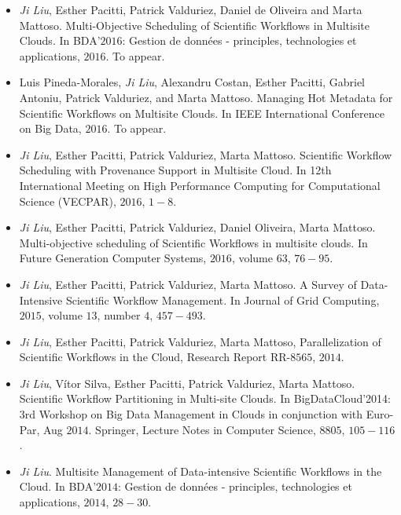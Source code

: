 \begin{itemize}

\item \textit{Ji Liu}, Esther Pacitti, Patrick Valduriez, Daniel de Oliveira and Marta Mattoso. Multi-Objective Scheduling of Scientific Workflows in Multisite Clouds. In BDA’$2016$: Gestion de données - principles, technologies et applications, $2016$. To appear.

\item Luis Pineda-Morales, \textit{Ji Liu}, Alexandru Costan, Esther Pacitti, Gabriel Antoniu, Patrick Valduriez, and Marta Mattoso. Managing Hot Metadata for Scientific Workflows on Multisite Clouds. In IEEE International Conference on Big Data, $2016$. To appear.

\item \textit{Ji Liu}, Esther Pacitti, Patrick Valduriez, Marta Mattoso. Scientific Workflow Scheduling with Provenance Support in Multisite Cloud. In 12th International Meeting on High Performance Computing for Computational Science (VECPAR), $2016$, $1-8$.

\item \textit{Ji Liu}, Esther Pacitti, Patrick Valduriez, Daniel Oliveira, Marta Mattoso. Multi-objective scheduling of Scientific Workflows in multisite clouds. In Future Generation Computer Systems, $2016$, volume $63$, $76-95$.

\item \textit{Ji Liu}, Esther Pacitti, Patrick Valduriez, Marta Mattoso. A Survey of Data-Intensive Scientific Workflow Management. In Journal of Grid Computing, $2015$, volume $13$, number $4$, $457-493$.

\item \textit{Ji Liu}, Esther Pacitti, Patrick Valduriez, Marta Mattoso, Parallelization of Scientific Workflows in the Cloud, Research Report RR-$8565$, $2014$.

\item \textit{Ji Liu}, V\'{i}tor Silva, Esther Pacitti, Patrick Valduriez, Marta Mattoso. Scientific Workflow Partitioning in Multi-site Clouds. In BigDataCloud'2014: 3rd Workshop on Big Data Management in Clouds in conjunction with Euro-Par, Aug $2014$. Springer, Lecture Notes in Computer Science, $8805$,  $105-116$.

\item \textit{Ji Liu}. Multisite Management of Data-intensive Scientific Workflows in the Cloud. In BDA’$2014$: Gestion de données - principles, technologies et applications, $2014$, $28-30$.

\end{itemize}

